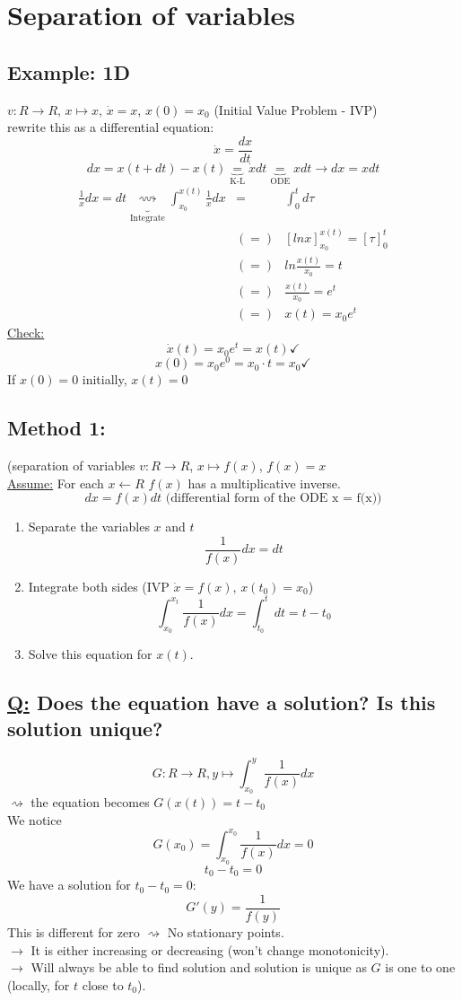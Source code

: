 \documentclass[a4paper, 12pt]{article}
\begin{document}
\section{Separation of variables}
\subsection{Example: 1D} 
$v:R \rightarrow R$, $x \mapsto x$, $\dot{x} = x$, $x(0) = x_0$ (Initial Value Problem - IVP)\\
rewrite this as a differential equation:\\
$$\dot{x} = \frac{dx}{dt}$$
$$ dx = x(t + dt) - x(t) \underbrace{=}_{\text{K-L}} \dot{x}dt \underbrace{=}_{\text{ODE}} xdt \rightarrow dx = xdt$$
\begin{eqnarray*}
\frac{1}{x} dx = dt \underbrace{\rightsquigarrow}_{\text{Integrate}} \int_{x_0}^{x(t)} \frac{1}{x} dx &=& \int_{0}^{t} d\tau\\
&(=)& [lnx]_{x_0}^{x(t)} = [\tau]_{0}^{t}\\
&(=)& ln \frac{x(t)}{x_0} = t\\
&(=)& \frac{x(t)}{x_0} = e^t\\
&(=)& x(t) = x_0 e^t
\end{eqnarray*}
\underline{Check:}
$$\dot{x}(t) = x_0 e^t = x(t) \checkmark$$
$$x(0) = x_0 e^0 = x_0 \cdot t = x_0 \checkmark$$
If $x(0) = 0$ initially, $x(t) = 0$\\
\subsection{Method 1:} 
(separation of variables $v:R \rightarrow R$, $x \mapsto f(x)$, $f(x) = x$\\
\underline{Assume:} For each $x \leftarrow R$  $f(x)$ has a multiplicative inverse.
$$dx = f(x) dt \text{ (differential form of the ODE x = f(x))}$$
\begin{enumerate}
\item Separate the variables $x$ and $t$ $$\frac{1}{f(x)} dx = dt$$
\item Integrate both sides (IVP $\dot{x} = f(x)$, $x(t_0) = x_0$) $$\int_{x_0}^{x_t} \frac{1}{f(x)} dx= \int_{t_0}^{t} dt= t - t_0$$
\item Solve this equation for $x(t)$.
\end{enumerate}
\subsection{\underline{Q:} Does the equation have a solution? Is this solution unique?}
$$G:R \rightarrow R, y \mapsto \int_{x_0}^{y} \frac{1}{f(x)}dx$$
$\rightsquigarrow$ the equation becomes $G(x(t)) = t - t_0$\\
We notice $$ G(x_0) = \int_{x_0}^{x_0} \frac{1}{f(x)} dx = 0$$ $$ t_0 - t_0 = 0$$
We have a solution for $ t_0 - t_0 = 0$:\\
$$G'(y) = \frac{1}{f(y)}$$
This is different for zero $\rightsquigarrow$ No stationary points.\\
$\rightarrow$ It is either increasing or decreasing  (won't change monotonicity).\\
$\rightarrow$ Will always be able to find solution and solution is unique as $G$ is one to one (locally, for $t$ close to $t_0$).
\end{document}
